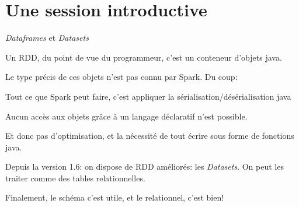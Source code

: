 \section{Une session introductive}

\begin{frame}[fragile]{\textit{Dataframes} et \textit{Datasets}}

Un RDD, du point de vue du programmeur, c'est un conteneur d'objets java.

\vfill

Le type précis de ces objets n'est pas connu par Spark. Du coup:

\begin{redbullet}
  \item Tout ce que Spark peut faire, c'est appliquer la sérialisation/désérialisation java 
  \item Aucun accès aux objets grâce à un langage déclaratif n'est possible.
  \item Et donc pas d'optimisation, et la nécessité de tout écrire sous forme de fonctions java. 
\end{redbullet}

\vfill

Depuis la version 1.6: on dispose de RDD améliorés: les \textit{Datasets}. On peut les traiter
comme des tables relationnelles. 

\vfill
\begin{blocgauche}
Finalement, le schéma c'est utile, et le relationnel, c'est bien!
\end{blocgauche}
\end{frame}
